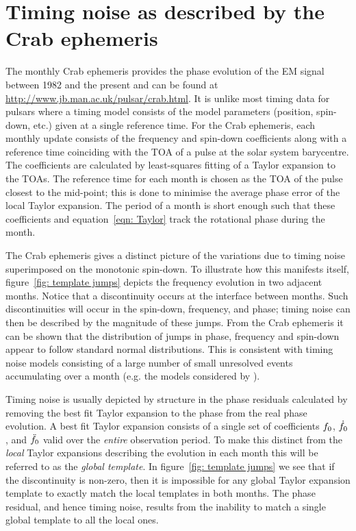 \documentclass[../full_thesis/full_thesis.tex]{subfiles}
\begin{document}
\section{Timing noise as described by the Crab ephemeris}
\label{sec: timing noise as described by the crab ephemeris}
The monthly Crab ephemeris \citep{Lyne1993} provides the phase evolution of the
EM signal between 1982 and the present and can be found at
\url{http://www.jb.man.ac.uk/pulsar/crab.html}. It is unlike most timing data
for pulsars where a timing model consists of the model parameters (position, spin-down,
        etc.) given at a single reference time.
For the Crab ephemeris, each monthly update consists
of the frequency and spin-down coefficients along with a reference time
coinciding with the TOA of a pulse at the solar system barycentre. The
coefficients are calculated by  least-squares fitting of a Taylor expansion to
the TOAs. The reference time for each month is chosen as the TOA of
the pulse closest to the mid-point; this is done to minimise the average phase
error of the local Taylor expansion.  The period of a month is short enough
such that these coefficients and equation~\eqref{eqn: Taylor} track the
rotational phase during the month.

The Crab ephemeris gives a distinct picture of the variations due to timing
noise superimposed on the monotonic spin-down. To illustrate how this manifests
itself, figure~\ref{fig: template jumps} depicts the frequency evolution in two
adjacent months. Notice that a discontinuity occurs at the interface between
months.  Such discontinuities will occur in the spin-down, frequency, and
phase; timing noise can then be described by the magnitude of these jumps.
From the Crab ephemeris it can be shown that the distribution of jumps in
phase, frequency and spin-down appear to follow standard normal distributions.
This is consistent with timing noise models consisting of a large number of
small unresolved events accumulating over a month (e.g. the models considered
by \citet{Cordes1981}).

Timing noise is usually depicted by structure in the phase residuals calculated
by removing the best fit Taylor expansion to the phase from the real phase
evolution. A best fit Taylor expansion consists of a single set of coefficients
$f_{0}$, $\dot{f}_{0}$, and $\ddot{f}_{0}$ valid over the \emph{entire}
observation period. To make this distinct from the \emph{local} Taylor
expansions describing the evolution in each month this will be referred to as
the \emph{global template}.  In figure~\ref{fig: template jumps} we see that if
the discontinuity is non-zero, then it is impossible for any global Taylor
expansion template to exactly match the local templates in both months. The
phase residual, and hence timing noise, results from the inability to match a
single global template to all the local ones.
\end{document}
